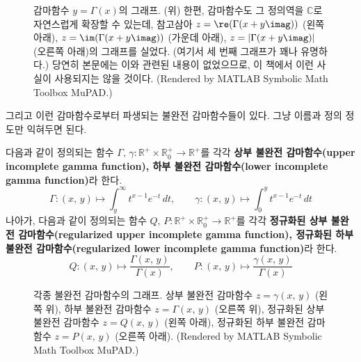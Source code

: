\begin{figure}[!ht]
    \caption{감마함수 $y=\Gamma(x)$의 그래프. (위) 한편, 감마함수도 그 정의역을 $\mathbb{C}$로 자연스럽게 확장할 수 있는데, 참고삼아 $z=\re(\Gamma(x+y\imag))$ (왼쪽 아래), $z=\im(\Gamma(x+y\imag))$ (가운데 아래), $z=|\Gamma(x+y\imag)|$ (오른쪽 아래)의 그래프를 실었다. (여기서 세 번째 그래프가 꽤나 유명하다.) 당연히 본문에는 이와 관련된 내용이 없었으므로, 이 책에서 이런 사실이 사용되지는 않을 것이다. (Rendered by MATLAB Symbolic Math Toolbox MuPAD.)}
\end{figure}

그리고 이런 감마함수로부터 파생되는 불완전 감마함수들이 있다. 그냥 이름과 정의 정도만 익혀두면 된다.

\begin{definition}
    다음과 같이 정의되는 함수 $\Gamma,\,\gamma:\mathbb{R}^+\times\mathbb{R}^+_0\to\mathbb{R}^+$를 각각 \textbf{상부 불완전 감마함수(upper incomplete gamma function), 하부 불완전 감마함수(lower incomplete gamma function)}라 한다.
    \begin{equation*}
        \Gamma:(x,\,y)\mapsto\int_y^\infty t^{x-1}e^{-t}\,dt,\qquad\gamma:(x,\,y)\mapsto\int_0^yt^{x-1}e^{-t}\,dt
    \end{equation*}
    나아가, 다음과 같이 정의되는 함수 $Q,\,P:\mathbb{R}^+\times\mathbb{R}^+_0\to\mathbb{R}^+$를 각각 \textbf{정규화된 상부 불완전 감마함수(regularized upper incomplete gamma function), 정규화된 하부 불완전 감마함수(regularized lower incomplete gamma function)}라 한다.
    \begin{equation*}
        Q:(x,\,y)\mapsto\frac{\Gamma(x,\,y)}{\Gamma(x)},\qquad P:(x,\,y)\mapsto\frac{\gamma(x,\,y)}{\Gamma(x)}
    \end{equation*}
\end{definition}

\begin{figure}[!ht]
    \centering
\end{figure}

\begin{figure}[!ht]
    \centering
    \caption{각종 불완전 감마함수의 그래프. 상부 불완전 감마함수 $z=\gamma(x,\,y)$ (왼쪽 위), 하부 불완전 감마함수 $z=\Gamma(x,\,y)$ (오른쪽 위), 정규화된 상부 불완전 감마함수 $z=Q(x,\,y)$ (왼쪽 아래), 정규화된 하부 불완전 감마함수 $z=P(x,\,y)$ (오른쪽 아래). (Rendered by MATLAB Symbolic Math Toolbox MuPAD.)}
\end{figure}

